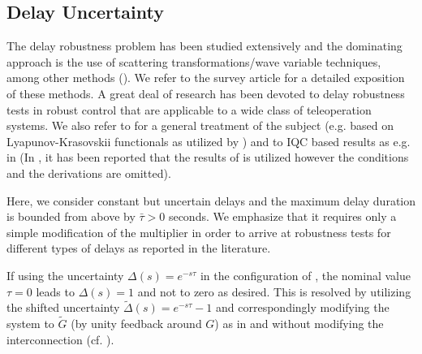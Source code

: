 \subsection{Delay Uncertainty}\label{sec:delayiqc}

The delay robustness problem has been studied extensively and the dominating approach 
is the use of scattering transformations/wave variable techniques, among other methods 
(\cite{leungfa, eusebi, andersonspong, nieslotine, nieslotine2, hokayemspong, yokokohji, 
lozano, arcara, parkcho, aziminejad, leespong}). We refer to the survey article \cite{hokayemspong} 
for a detailed exposition of these methods. A great deal of research has been devoted to 
delay robustness tests in robust control that are applicable to a wide class of teleoperation 
systems. We also refer to \cite{richard} for a general treatment of the subject (e.g. based on 
Lyapunov-Krasovskii functionals as utilized by \cite{delgado1,delgadoisie}) and to IQC based results as e.g. 
in \cite{scorletti,junsafonov,kaorantzer,niculescu} (In \cite{delgado2}, it has been reported that 
the results of \cite{kaorantzer} is utilized however the conditions and the derivations are omitted). 

Here, we consider constant but uncertain delays and the maximum delay duration is bounded 
from above by $\bar{\tau} > 0$ seconds. We emphasize that it requires only a simple 
modification of the multiplier in order to arrive at robustness tests for different types 
of delays as reported in the literature.


If using the uncertainty $\Delta(s)=e^{-s\tau}$ in the configuration of , 
the nominal value $\tau=0$ leads to $\Delta(s)=1$ and not to zero as desired. This is resolved 
by utilizing the shifted uncertainty $\tilde{\Delta}(s)=e^{-s\tau}-1$ and correspondingly 
modifying the system to $\tilde{G}$ (by unity feedback around $G$) as in 
 and without modifying the interconnection (cf. \cite{leungfa}).

